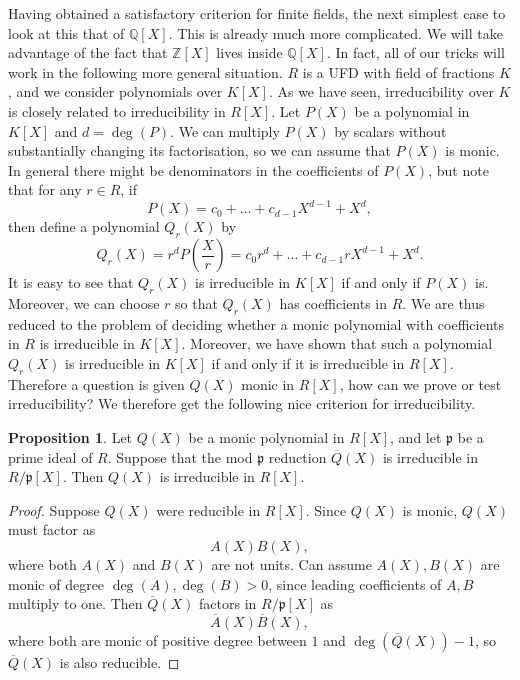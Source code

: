 \documentclass{article}
\newcommand{\Z}{\mathbb{Z}}
\newcommand{\Q}{\mathbb{Q}}
\newcommand{\rb}[1]{\left( #1 \right)}
\renewcommand{\sb}[1]{\left[ #1 \right]}
\theoremstyle{definition}\newtheorem{definition}{Definition}[subsection]
\theoremstyle{definition}\newtheorem{remark}[definition]{Remark}
\theoremstyle{definition}\newtheorem*{example}{Example}
\theoremstyle{definition}\newtheorem*{note}{Note}
\newtheorem{proposition}[definition]{Proposition}
\begin{document}
Having obtained a satisfactory criterion for finite fields, the next simplest case to look at this that of $ \Q\sb{X} $. This is already much more complicated. We will take advantage of the fact that $ \Z\sb{X} $ lives inside $ \Q\sb{X} $. In fact, all of our tricks will work in the following more general situation. $ R $ is a UFD with field of fractions $ K $, and we consider polynomials over $ K\sb{X} $. As we have seen, irreducibility over $ K $ is closely related to irreducibility in $ R\sb{X} $. Let $ P\rb{X} $ be a polynomial in $ K\sb{X} $ and $ d = \deg\rb{P} $. We can multiply $ P\rb{X} $ by scalars without substantially changing its factorisation, so we can assume that $ P\rb{X} $ is monic. In general there might be denominators in the coefficients of $ P\rb{X} $, but note that for any $ r \in R $, if
$$ P\rb{X} = c_0 + \dots + c_{d - 1}X^{d - 1} + X^d, $$
then define a polynomial $ Q_r\rb{X} $ by
$$ Q_r\rb{X} = r^dP\rb{\dfrac{X}{r}} = c_0r^d + \dots + c_{d - 1}rX^{d - 1} + X^d. $$
It is easy to see that $ Q_r\rb{X} $ is irreducible in $ K\sb{X} $ if and only if $ P\rb{X} $ is. Moreover, we can choose $ r $ so that $ Q_r\rb{X} $ has coefficients in $ R $. We are thus reduced to the problem of deciding whether a monic polynomial with coefficients in $ R $ is irreducible in $ K\sb{X} $. Moreover, we have shown that such a polynomial $ Q_r\rb{X} $ is irreducible in $ K\sb{X} $ if and only if it is irreducible in $ R\sb{X} $. Therefore a question is given $ Q\rb{X} $ monic in $ R\sb{X} $, how can we prove or test irreducibility? We therefore get the following nice criterion for irreducibility.

\begin{proposition}
Let $ Q\rb{X} $ be a monic polynomial in $ R\sb{X} $, and let $ \mathfrak{p} $ be a prime ideal of $ R $. Suppose that the mod $ \mathfrak{p} $ reduction $ \overline{Q}\rb{X} $ is irreducible in $ R / \mathfrak{p}\sb{X} $. Then $ Q\rb{X} $ is irreducible in $ R\sb{X} $.
\end{proposition}

\begin{proof}
Suppose $ Q\rb{X} $ were reducible in $ R\sb{X} $. Since $ Q\rb{X} $ is monic, $ Q\rb{X} $ must factor as
$$ A\rb{X}B\rb{X}, $$
where both $ A\rb{X} $ and $ B\rb{X} $ are not units. Can assume $ A\rb{X}, B\rb{X} $ are monic of degree $ \deg\rb{A}, \deg\rb{B} > 0 $, since leading coefficients of $ A, B $ multiply to one. Then $ \overline{Q}\rb{X} $ factors in $ R / \mathfrak{p}\sb{X} $ as
$$ \overline{A}\rb{X}\overline{B}\rb{X}, $$
where both are monic of positive degree between $ 1 $ and $ \deg\rb{\overline{Q}\rb{X}} - 1 $, so $ \overline{Q}\rb{X} $ is also reducible.
\end{proof}
\end{document}

